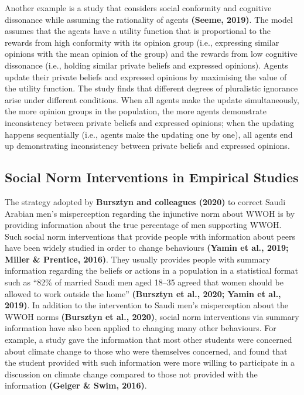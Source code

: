 \documentclass[
  11pt,
]{article}
\begin{document}
Another example is a study that considers social conformity and
cognitive dissonance while assuming the rationality of agents
\textbf{(Seeme, 2019)}. The model assumes that the agents have a utility
function that is proportional to the rewards from high conformity with
its opinion group (i.e., expressing similar opinions with the mean
opinion of the group) and the rewards from low cognitive dissonance
(i.e., holding similar private beliefs and expressed opinions). Agents
update their private beliefs and expressed opinions by maximising the
value of the utility function. The study finds that different degrees of
pluralistic ignorance arise under different conditions. When all agents
make the update simultaneously, the more opinion groups in the
population, the more agents demonstrate inconsistency between private
beliefs and expressed opinions; when the updating happens sequentially
(i.e., agents make the updating one by one), all agents end up
demonstrating inconsistency between private beliefs and expressed
opinions.

\hypertarget{social-norm-interventions-in-empirical-studies}{%
\subsection{Social Norm Interventions in Empirical
Studies}\label{social-norm-interventions-in-empirical-studies}}

The strategy adopted by \textbf{Bursztyn and colleagues (2020)} to
correct Saudi Arabian men's misperception regarding the injunctive norm
about WWOH is by providing information about the true percentage of men
supporting WWOH. Such social norm interventions that provide people with
information about peers have been widely studied in order to change
behaviours \textbf{(Yamin et al., 2019; Miller \& Prentice, 2016)}. They
usually provides people with summary information regarding the beliefs
or actions in a population in a statistical format such as ``82\% of
married Saudi men aged 18--35 agreed that women should be allowed to
work outside the home'' \textbf{(Bursztyn et al., 2020; Yamin et al.,
2019)}. In addition to the intervention to Saudi men's misperception
about the WWOH norms \textbf{(Bursztyn et al., 2020)}, social norm
interventions via summary information have also been applied to changing
many other behaviours. For example, a study gave the information that
most other students were concerned about climate change to those who
were themselves concerned, and found that the student provided with such
information were more willing to participate in a discussion on climate
change compared to those not provided with the information
\textbf{(Geiger \& Swim, 2016)}.
\end{document}
